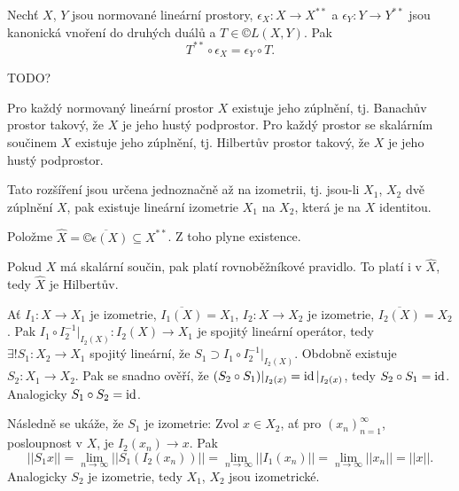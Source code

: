 \documentclass[12pt]{article}					%
\begin{document}
\begin{tvrzeni}[J. P. Schauder, 1930]
	Nechť $X$, $Y$ jsou normované lineární prostory, $\epsilon_X: X \rightarrow X^{**}$ a $\epsilon_Y: Y \rightarrow Y^{**}$ jsou kanonická vnoření do druhých duálů a $T \in ©L(X, Y)$. Pak
	$$ T^{**} \circ \epsilon_X = \epsilon_Y \circ T. $$


	\begin{dukazin}
		TODO?
	\end{dukazin}
\end{tvrzeni}

\begin{veta}
	Pro každý normovaný lineární prostor $X$ existuje jeho zúplnění, tj. Banachův prostor takový, že $X$ je jeho hustý podprostor. Pro každý prostor se skalárním součinem $X$ existuje jeho zúplnění, tj. Hilbertův prostor takový, že $X$ je jeho hustý podprostor.

	Tato rozšíření jsou určena jednoznačně až na izometrii, tj. jsou-li $X_1$, $X_2$ dvě zúplnění $X$, pak existuje lineární izometrie $X_1$ na $X_2$, která je na $X$ identitou.

	\begin{dukazin}
		Položme $\hat{X} = \overline{©\epsilon(X)} \subseteq X^{**}$. Z toho plyne existence.

		Pokud $X$ má skalární součin, pak platí rovnoběžníkové pravidlo. To platí i v $\hat{X}$, tedy $\hat{X}$ je Hilbertův.

		Ať $I_1: X \rightarrow X_1$ je izometrie, $\overline{I_1(X)} = X_1$, $I_2: X \rightarrow X_2$ je izometrie, $\overline{I_2(X)} = X_2$. Pak $I_1 \circ I_2^{-1}|_{I_2(X)}: I_2(X) \rightarrow X_1$ je spojitý lineární operátor, tedy $\exists! S_1: X_2 \rightarrow X_1$ spojitý lineární, že $S_1 \supset I_1 \circ I_2^{-1}|_{I_2(X)}$. Obdobně existuje $S_2: X_1 \rightarrow X_2$. Pak se snadno ověří, že $(S_2 \circ S_1)|_{I_2(x)} = \operatorname{id}|_{I_2(x)}$, tedy $S_2 \circ S_1 = \operatorname{id}$. Analogicky $S_1 \circ S_2 = \operatorname{id}$.

		Následně se ukáže, že $S_1$ je izometrie: Zvol $x \in X_2$, ať pro $(x_n)_{n=1}^∞$, posloupnost v $X$, je $I_2(x_n) \rightarrow x$. Pak
		$$ ||S_1 x|| = \lim_{n \rightarrow ∞}||S_1(I_2(x_n))|| = \lim_{n \rightarrow ∞} ||I_1(x_n)|| = \lim_{n \rightarrow ∞}||x_n|| = ||x||. $$
		Analogicky $S_2$ je izometrie, tedy $X_1$, $X_2$ jsou izometrické.
	\end{dukazin}

\end{veta}
	
\end{document}
